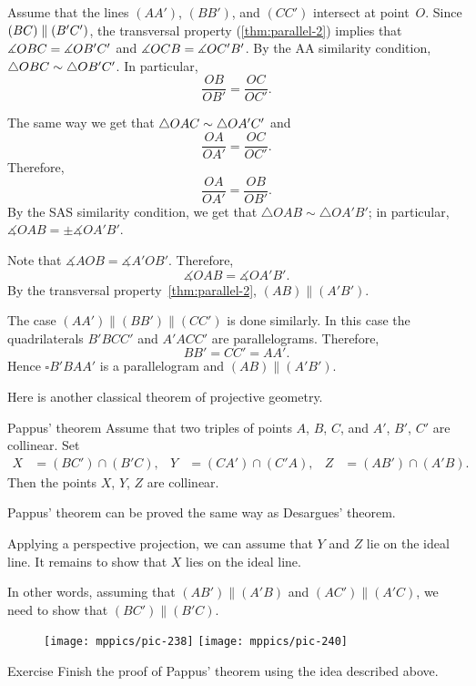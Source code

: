 Assume that the lines $(AA')$, $(BB')$, and $(CC')$ intersect at point~$O$.
Since $(BC)\z\parallel (B'C')$, 
the transversal property (\ref{thm:parallel-2}) implies that $\measuredangle OBC\z= \measuredangle OB'C'$ and $\measuredangle OCB\z= \measuredangle OC'B'$.
By the AA similarity condition, $\triangle OBC\z\sim\triangle OB'C'$.
In particular,
\[\frac{OB}{OB'}=\frac{OC}{OC'}.\]

The same way we get that $\triangle OAC\z\sim\triangle OA'C'$ and
\[\frac{OA}{OA'}=\frac{OC}{OC'}.\]
Therefore, 
\[\frac{OA}{OA'}=\frac{OB}{OB'}.\]
By the SAS similarity condition, 
we get that $\triangle OAB\sim\triangle OA'B'$;
in particular, $\measuredangle OAB=\pm\measuredangle OA'B'$.

Note that $\measuredangle AOB=\measuredangle A'OB'$.
Therefore, 
\[\measuredangle OAB=\measuredangle OA'B'.\]
By the transversal property~\ref{thm:parallel-2},
$(AB)\parallel (A'B')$.

The case $(AA')\parallel(BB')\parallel(CC')$ is done similarly.
In this case the quadrilaterals $B'BCC'$ and $A'ACC'$ are parallelograms.
Therefore, 
\[BB'=CC'=AA'.\]
Hence $\square B'BAA'$ is a parallelogram and $(AB)\parallel (A'B')$.
\qeds

Here is another classical theorem of projective geometry.

\begin{thm}{Pappus' theorem}\label{thm:pappus}
Assume that two triples of points $A$, $B$, $C$,
and $A'$, $B'$, $C'$ are collinear.
Set 
\begin{align*}
X&=(BC')\cap(B'C),
&
Y&=(CA')\cap(C'A),
&
Z&=(AB')\cap(A'B).
\end{align*}
Then the points $X$, $Y$, $Z$ are collinear.
\end{thm}

Pappus' theorem can be proved the same way as Desargues' theorem.

Applying a perspective projection, we can assume that $Y$ and $Z$ lie on the ideal line.
It remains to show that $X$ lies on the ideal line.

In other words, assuming that $(AB')\parallel (A'B)$ and $(AC')\parallel (A'C)$, we need to show that $(BC')\parallel(B'C)$.

\begin{figure}[h!]
\centering
\texttt{[image: mppics/pic-238]}
\hskip15mm
\texttt{[image: mppics/pic-240]}
\end{figure}


\begin{thm}{Exercise}\label{ex:pappus}
Finish the proof of Pappus' theorem using the idea described above.
\end{thm}

